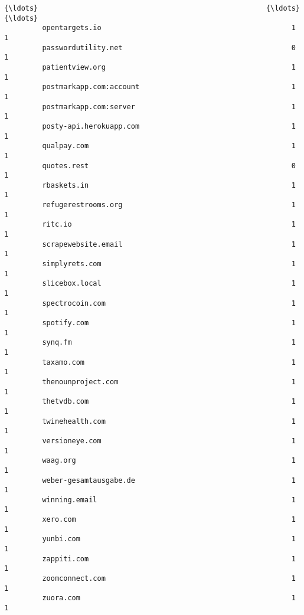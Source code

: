 \documentclass[11pt]{article}
\begin{document}
\begin{Verbatim}[commandchars=\\\{\}]
         {\ldots}                                                      {\ldots}      {\ldots}   
         opentargets.io                                             1        1   
         passwordutility.net                                        0        1   
         patientview.org                                            1        1   
         postmarkapp.com:account                                    1        1   
         postmarkapp.com:server                                     1        1   
         posty-api.herokuapp.com                                    1        1   
         qualpay.com                                                1        1   
         quotes.rest                                                0        1   
         rbaskets.in                                                1        1   
         refugerestrooms.org                                        1        1   
         ritc.io                                                    1        1   
         scrapewebsite.email                                        1        1   
         simplyrets.com                                             1        1   
         slicebox.local                                             1        1   
         spectrocoin.com                                            1        1   
         spotify.com                                                1        1   
         synq.fm                                                    1        1   
         taxamo.com                                                 1        1   
         thenounproject.com                                         1        1   
         thetvdb.com                                                1        1   
         twinehealth.com                                            1        1   
         versioneye.com                                             1        1   
         waag.org                                                   1        1   
         weber-gesamtausgabe.de                                     1        1   
         winning.email                                              1        1   
         xero.com                                                   1        1   
         yunbi.com                                                  1        1   
         zappiti.com                                                1        1   
         zoomconnect.com                                            1        1   
         zuora.com                                                  1        1   
         

\end{Verbatim}
\end{document}

